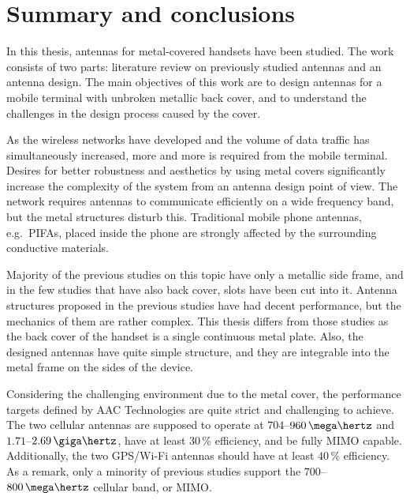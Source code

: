 \section{Summary and conclusions} 
\label{sec:conclusions}

\begin{comment}
\begin{itemize}
\item[--]yhteenveto mitä tehty
\item[--]päätulokset
\item[--]johtopäätökset
\item[--]oma arvio?
\end{itemize}
\end{comment}

In this thesis, antennas for metal-covered handsets have been studied. The work consists of two parts: literature review on previously studied antennas and an antenna design. The main objectives of this work are to design antennas for a mobile terminal with unbroken metallic back cover, and to understand the challenges in the design process caused by the cover.

As the wireless networks have developed and the volume of data traffic has simultaneously increased, more and more is required from the mobile terminal. Desires for better robustness and aesthetics by using metal covers significantly increase the complexity of the system from an antenna design point of view. The network requires antennas to communicate efficiently on a wide frequency band, but the metal structures disturb this. Traditional mobile phone antennas, e.g.\ PIFAs, placed inside the phone are strongly affected by the surrounding conductive materials.

Majority of the previous studies on this topic have only a metallic side frame, and in the few studies that have also back cover, slots have been cut into it. Antenna structures proposed in the previous studies have had decent performance, but the mechanics of them are rather complex. This thesis differs from those studies as the back cover of the handset is a single continuous metal plate. Also, the designed antennas have quite simple structure, and they are integrable into the metal frame on the sides of the device.

Considering the challenging environment due to the metal cover, the performance targets defined by AAC Technologies are quite strict and challenging to achieve. The two cellular antennas are supposed to operate at $704$--$960\,\mega\hertz$ and $1.71$--$2.69\,\giga\hertz$, have at least 30\,\% efficiency, and be fully MIMO capable. Additionally, the two GPS/Wi-Fi antennas should have at least $40\,\%$ efficiency. As a remark, only a minority of previous studies support the $700$--$800\,\mega\hertz$ cellular band, or MIMO.

